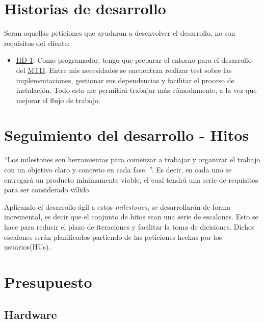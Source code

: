 \section{Historias de desarrollo}
Seran aquellas peticiones que ayudaran a desenvolver el desarrollo, no son requisitos del cliente:

\begin{itemize}
    \item \href{https://github.com/marcosrmartin/MTD_Server/issues/16}{HD-1}: Como programador, tengo que preparar el entorno para el desarrollo del \href{https://github.com/marcosrmartin/MTD_Server/commit/20df5bb6f5af3de7e557c254ad47089db34845aa}{MTD}. Entre mis necesidades se encuentran realizar test sobre las implementaciones, gestionar sus dependencias y facilitar el proceso de instalación. Todo esto me permitirá trabajar más cómodamente, a la vez que mejorar el flujo de trabajo.
\end{itemize}

\section{Seguimiento del desarrollo - Hitos}
``Los milestones son herramientas para comenzar a trabajar y organizar el trabajo con un objetivo claro y concreto en cada fase.
''\cite{iv}. Es decir, en cada uno se entregará un producto mínimamente viable, el cual tendrá una serie de requisitos para ser considerado válido.

Aplicando el desarrollo ágil a estos \textit{milestones}, se desarrollarán de forma incremental, es decir que el conjunto de hitos sean una serie de escalones. Esto se hace para reducir el plazo de iteraciones y facilitar la toma de dicisiones. Dichos escalones serán planificados partiendo de las peticiones hechas por los usuarios(HUs).


\section{Presupuesto}

\subsection{Hardware}

